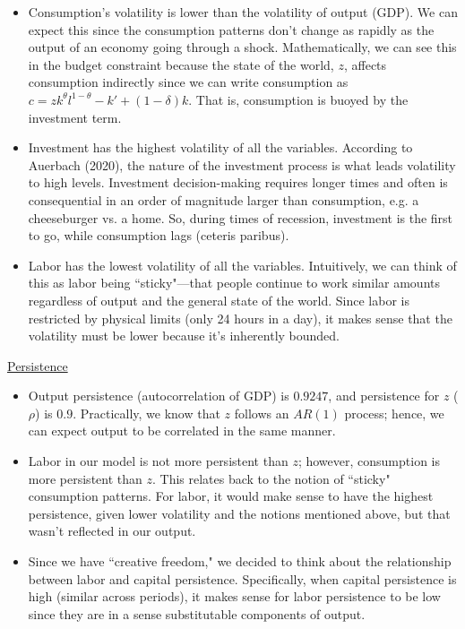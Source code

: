 \documentclass[12pt]{article}
\begin{document}
\begin{doublespace}
\begin{itemize}
\item Consumption's volatility is lower than the volatility of output (GDP). We can expect this since the consumption patterns don't change as rapidly as the output of an economy going through a shock. Mathematically, we can see this in the budget constraint because the state of the world, $z$, affects consumption indirectly since we can write consumption as $c = zk^\theta l^{1-\theta} -k' + (1-\delta)k$. That is, consumption is buoyed by the investment term.
\item Investment has the highest volatility of all the variables. According to Auerbach (2020), the nature of the investment process is what leads volatility to high levels. Investment decision-making requires longer times and often is consequential in an order of magnitude larger than consumption, e.g. a cheeseburger vs. a home. So, during times of recession, investment is the first to go, while consumption lags (ceteris paribus).
\item Labor has the lowest volatility of all the variables. Intuitively, we can think of this as labor being ``sticky"---that people continue to work similar amounts regardless of output and the general state of the world. Since labor is restricted by physical limits (only 24 hours in a day), it makes sense that the volatility must be lower because it's inherently bounded.
\end{itemize}

\begin{center}
\normalsize\underline{Persistence}
\end{center}

\begin{itemize}
\item Output persistence (autocorrelation of GDP) is $0.9247$, and persistence for $z$ ($\rho$) is $0.9$. Practically, we know that $z$ follows an $AR(1)$ process; hence, we can expect output to be correlated in the same manner.
\item Labor in our model is not more persistent than $z$; however, consumption is more persistent than $z$. This relates back to the notion of ``sticky" consumption patterns. For labor, it would make sense to have the highest persistence, given lower volatility and the notions mentioned above, but that wasn't reflected in our output.
\item Since we have ``creative freedom," we decided to think about the relationship between labor and capital persistence. Specifically, when capital persistence is high (similar across periods), it makes sense for labor persistence to be low since they are in a sense substitutable components of output.
\end{itemize}


\end{doublespace}
\end{document}
